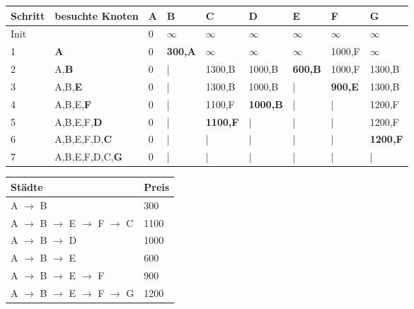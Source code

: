 \documentclass{bschlangaul-aufgabe}
\begin{document}
\noindent
\begin{tabular}{|l|l|l|l|l|l|l|l|l|}
\hline
Schritt & besuchte Knoten & A & B & C & D & E & F & G \\\hline\hline

Init &
& %
0 & %
$\infty$ & %
$\infty$ & %
$\infty$ & %
$\infty$ & %
$\infty$ & %
$\infty$ \\\hline%

1 &
\textbf{A} & %
0 & %
\textbf{300,A} & %
$\infty$ & %
$\infty$ & %
$\infty$ & %
1000,F & %
$\infty$ \\\hline%

2 &
A,\textbf{B} & %
0 & %
| & %
1300,B & %
1000,B & %
\textbf{600,B} & %
1000,F & %
1300,B \\\hline%

3 &
A,B,\textbf{E} & %
0 & %
| & %
1300,B & %
1000,B & %
| & %
\textbf{900,E} & %
1300,B \\\hline%

4 &
A,B,E,\textbf{F} & %
0 & %
| & %
1100,F & %
\textbf{1000,B} & %
| & %
| & %
1200,F \\\hline%

5 &
A,B,E,F,\textbf{D} & %
0 & %
| & %
\textbf{1100,F} & %
| & %
| & %
| & %
1200,F \\\hline%

6 &
A,B,E,F,D,\textbf{C} & %
0 & %
| & %
| & %
| & %
| & %
| & %
\textbf{1200,F} \\\hline%

7 &
A,B,E,F,D,C,\textbf{G} & %
0 & %
| & %
| & %
| & %
| & %
| & %
| \\\hline%
\end{tabular}

\noindent
\begin{tabular}{|l|l|}
\hline
Städte & Preis\\\hline\hline
A $\rightarrow$ B & 300 \\\hline
A $\rightarrow$ B $\rightarrow$ E $\rightarrow$ F $\rightarrow$ C & 1100 \\\hline
A $\rightarrow$ B $\rightarrow$ D & 1000 \\\hline
A $\rightarrow$ B $\rightarrow$ E & 600 \\\hline
A $\rightarrow$ B $\rightarrow$ E $\rightarrow$ F & 900 \\\hline
A $\rightarrow$ B $\rightarrow$ E $\rightarrow$ F $\rightarrow$ G & 1200 \\\hline
\end{tabular}
\end{document}
